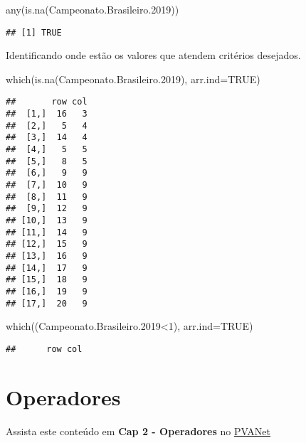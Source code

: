 \documentclass[
]{book}
\newenvironment{Shaded}{\begin{snugshade}}{\end{snugshade}}
\newcommand{\AttributeTok}[1]{\textcolor[rgb]{0.77,0.63,0.00}{#1}}
\newcommand{\ConstantTok}[1]{\textcolor[rgb]{0.00,0.00,0.00}{#1}}
\newcommand{\DecValTok}[1]{\textcolor[rgb]{0.00,0.00,0.81}{#1}}
\newcommand{\FloatTok}[1]{\textcolor[rgb]{0.00,0.00,0.81}{#1}}
\newcommand{\FunctionTok}[1]{\textcolor[rgb]{0.00,0.00,0.00}{#1}}
\newcommand{\NormalTok}[1]{#1}
\newcommand{\SpecialCharTok}[1]{\textcolor[rgb]{0.00,0.00,0.00}{#1}}
\begin{document}
\begin{Shaded}
\begin{Highlighting}[]
\FunctionTok{any}\NormalTok{(}\FunctionTok{is.na}\NormalTok{(Campeonato.Brasileiro}\FloatTok{.2019}\NormalTok{))}
\end{Highlighting}
\end{Shaded}

\begin{verbatim}
## [1] TRUE
\end{verbatim}

Identificando onde estão os valores que atendem critérios desejados.

\begin{Shaded}
\begin{Highlighting}[]
\FunctionTok{which}\NormalTok{(}\FunctionTok{is.na}\NormalTok{(Campeonato.Brasileiro}\FloatTok{.2019}\NormalTok{), }\AttributeTok{arr.ind=}\ConstantTok{TRUE}\NormalTok{)}
\end{Highlighting}
\end{Shaded}

\begin{verbatim}
##       row col
##  [1,]  16   3
##  [2,]   5   4
##  [3,]  14   4
##  [4,]   5   5
##  [5,]   8   5
##  [6,]   9   9
##  [7,]  10   9
##  [8,]  11   9
##  [9,]  12   9
## [10,]  13   9
## [11,]  14   9
## [12,]  15   9
## [13,]  16   9
## [14,]  17   9
## [15,]  18   9
## [16,]  19   9
## [17,]  20   9
\end{verbatim}

\begin{Shaded}
\begin{Highlighting}[]
\FunctionTok{which}\NormalTok{((Campeonato.Brasileiro}\FloatTok{.2019}\SpecialCharTok{\textless{}}\DecValTok{1}\NormalTok{), }\AttributeTok{arr.ind=}\ConstantTok{TRUE}\NormalTok{)}
\end{Highlighting}
\end{Shaded}

\begin{verbatim}
##      row col
\end{verbatim}

\hypertarget{operadores}{%
\section{Operadores}\label{operadores}}

Assista este conteúdo em \textbf{Cap 2 - Operadores} no \href{https://www2.cead.ufv.br/sistemas/pvanet/geral/login.php}{PVANet}
\end{document}
